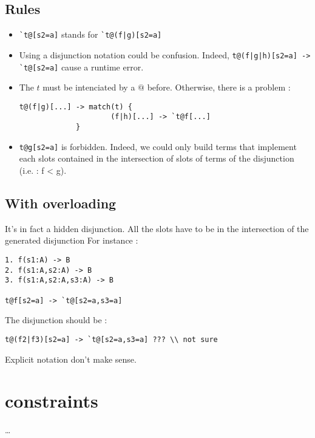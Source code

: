 \documentclass{article}
\begin{document}
\subsection{Rules}
\begin{itemize}
\item \verb$`t@[s2=a]$ stands for \verb$`t@(f|g)[s2=a]$
\item Using a disjunction notation could be confusion. Indeed, \verb$t@(f|g|h)[s2=a] -> `t@[s2=a]$ cause a runtime error.
\item The $t$ must be intenciated by a $@$ before. Otherwise, there is a problem :
\begin{verbatim}
t@(f|g)[...] -> match(t) {
                     (f|h)[...] -> `t@f[...]
             }
\end{verbatim}
\item \verb$t@g[s2=a]$ is forbidden. Indeed, we could only build terms that implement each slots contained in the intersection of slots of terms of the disjunction (i.e. : f < g).
\end{itemize}
\subsection{With overloading}
It's in fact a hidden disjunction. All the slots have to be in the intersection of the generated disjunction For instance :
\begin{verbatim}
1. f(s1:A) -> B
2. f(s1:A,s2:A) -> B
3. f(s1:A,s2:A,s3:A) -> B

t@f[s2=a] -> `t@[s2=a,s3=a]
\end{verbatim}
The disjunction should be :
\begin{verbatim}
t@(f2|f3)[s2=a] -> `t@[s2=a,s3=a] ??? \\ not sure
\end{verbatim}
Explicit notation don't make sense.
\section{constraints}
\dots
\end{document}
